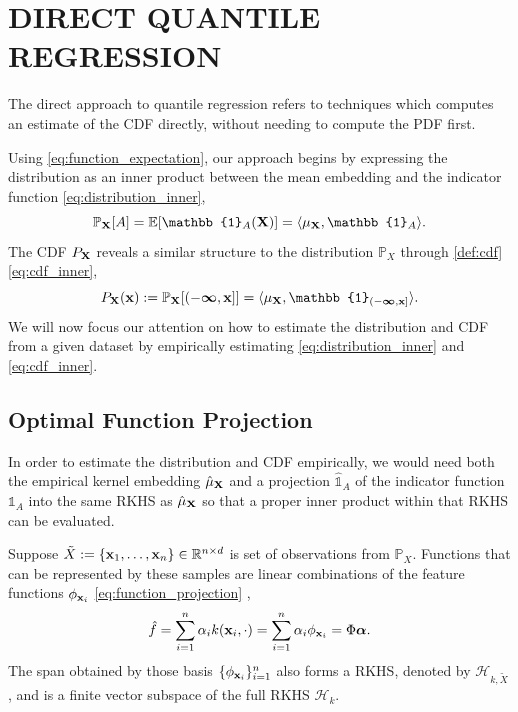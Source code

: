 \documentclass[twoside]{article} \usepackage{aistats2017}
\theoremstyle{definition}
\theoremstyle{theorem}
\newcommand{\rv}[1]{{#1}}
\newcommand{\ds}[1]{\tilde{#1}}
\newcommand{\expect}[1]{{\mathbb{E}[#1]}}
\newcommand{\inner}[2]{{\langle #1, #2 \rangle}}
\begin{document}
\section{DIRECT QUANTILE REGRESSION}
\label{sec:direct_quantile_regression}

	The direct approach to quantile regression refers to techniques which computes an estimate of the CDF directly, without needing to compute the PDF first.
	
	Using \eqref{eq:function_expectation}, our approach begins by expressing the distribution as an inner product between the mean embedding and the indicator function \eqref{eq:distribution_inner}, 
	\begin{equation}
		\mathbb{P}_{\bvec{\rv{X}}}[A] = \expect{\mathbb{1}_{A}(\bvec{\rv{X}})} = \inner{\mu_{\bvec{\rv{X}}}}{\mathbb{1}_{A}}.
	\label{eq:distribution_inner}
	\end{equation}
	The CDF  $P_{\bvec{\rv{X}}}$ reveals a similar structure to the distribution $\mathbb{P}_{\rv{X}}$ through \cref{def:cdf} \eqref{eq:cdf_inner},	
	\begin{equation}
		P_{\bvec{\rv{X}}}(\bvec{x}) := \mathbb{P}_{\bvec{\rv{X}}}[(-\bm{\infty}, \bvec{x}]] = \inner{\mu_{\bvec{\rv{X}}}}{\mathbb{1}_{(-\bm{\infty}, \bvec{x}]}}.
	\label{eq:cdf_inner}
	\end{equation}
	We will now focus our attention on how to estimate the distribution and CDF from a given dataset by empirically estimating \eqref{eq:distribution_inner} and \eqref{eq:cdf_inner}.
	
	\subsection{Optimal Function Projection}
	\label{sec:direct_quantile_regression:optimal_function_approximation}
	
		In order to estimate the distribution and CDF empirically, we would need both the empirical kernel embedding $\hat{\mu}_{\bvec{\rv{X}}}$ and a projection $\hat{\mathbb{1}}_{A}$ of the indicator function $\mathbb{1}_{A}$ into the same RKHS as $\hat{\mu}_{\bvec{\rv{X}}}$ so that a proper inner product within that RKHS can be evaluated.

		Suppose $\ds{X} := \{\bvec{x}_{1}, \dots, \bvec{x}_{n}\} \in \mathbb{R}^{n \times d}$ is set of observations from $\mathbb{P}_{\rv{X}}$. Functions that can be represented by these samples are linear combinations of the feature functions $\phi_{\mathbf{x}_{i}}$ \eqref{eq:function_projection} \citep{muandet2016kernel},
		\begin{equation}
			\hat{f} = \sum_{i = 1}^{n} \alpha_{i} k(\mathbf{x}_{i}, \cdot) = \sum_{i = 1}^{n} \alpha_{i} \phi_{\mathbf{x}_{i}} = \Phi \bm{\alpha}.
		\label{eq:function_projection}
		\end{equation}
		The span obtained by those basis $\{\phi_{\mathbf{x}_{i}}\}_{i = 1}^{n}$ also forms a RKHS, denoted by $\mathcal{H}_{k, \ds{X}}$, and is a finite vector subspace of the full RKHS $\mathcal{H}_{k}$.
\end{document}
